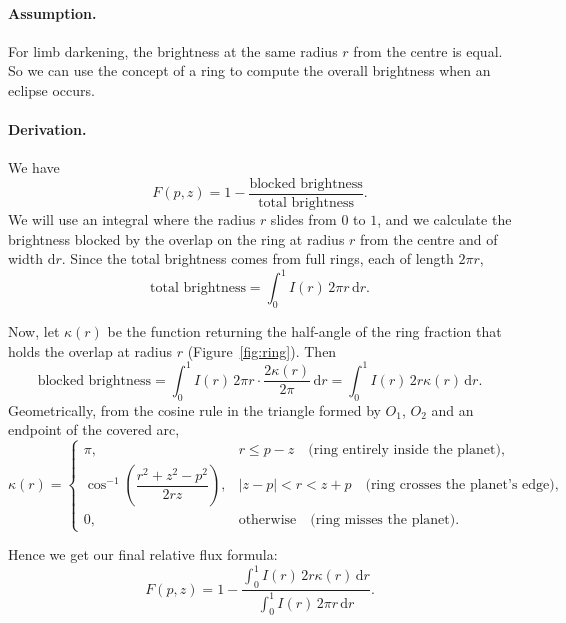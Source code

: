 \documentclass[11pt,a4paper]{article}
\begin{document}
\paragraph{Assumption.}
For limb darkening, the brightness at the same radius $r$ from the centre is
equal. So we can use the concept of a ring to compute the overall brightness
when an eclipse occurs.

\paragraph{Derivation.}
We have
\begin{equation}
  F(p,z) = 1 - \frac{\text{blocked brightness}}{\text{total brightness}}.
\end{equation}
We will use an integral where the radius $r$ slides from $0$ to $1$, and we
calculate the brightness blocked by the overlap on the ring at radius $r$ from
the centre and of width $\mathrm{d}r$. Since the total brightness comes from
full rings, each of length $2\pi r$,
\begin{equation}
  \text{total brightness} = \int_0^1 I(r)\, 2\pi r \,\mathrm{d}r .
\end{equation}

Now, let $\kappa(r)$ be the function returning the half-angle of the ring
fraction that holds the overlap at radius $r$ (Figure~\ref{fig:ring}). Then
\begin{equation}
  \text{blocked brightness}
  = \int_0^1 I(r)\, 2\pi r \cdot \frac{2\kappa(r)}{2\pi} \,\mathrm{d}r
  = \int_0^1 I(r)\, 2 r \kappa(r) \,\mathrm{d}r .
\end{equation}
Geometrically, from the cosine rule in the triangle formed by $O_1$, $O_2$
and an endpoint of the covered arc,
\begin{equation}
  \kappa(r) =
  \begin{cases}
    \pi, & r \le p - z
      \quad\text{(ring entirely inside the planet)}, \\[4pt]
    \cos^{-1}\!\left(\dfrac{r^2 + z^2 - p^2}{2 r z}\right),
      & |z - p| < r < z + p
      \quad\text{(ring crosses the planet's edge)}, \\[10pt]
    0, & \text{otherwise}
      \quad\text{(ring misses the planet)}.
  \end{cases}
\end{equation}

Hence we get our final relative flux formula:
\begin{equation}
  F(p,z) = 1 - \frac{\displaystyle\int_0^1 I(r)\, 2 r \kappa(r) \,\mathrm{d}r}
                    {\displaystyle\int_0^1 I(r)\, 2\pi r \,\mathrm{d}r}.
\end{equation}
\end{document}
